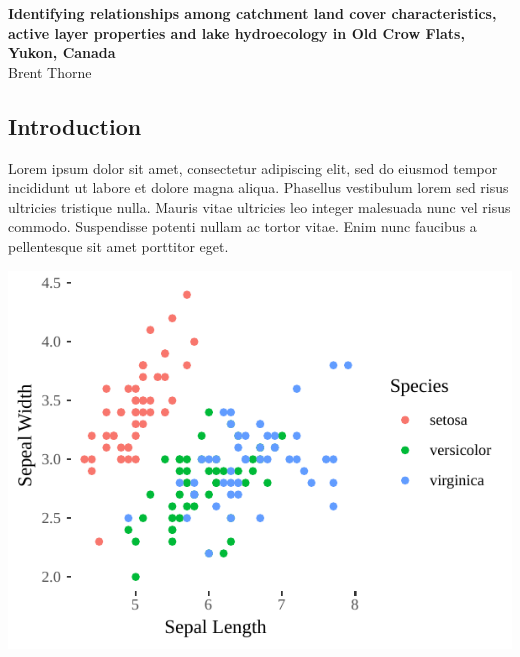\documentclass[30pt,extrafontsizes]{memoir}
\begin{document}
\begingroup
  \centering
  \huge\textbf{Identifying relationships among catchment land cover characteristics,
active layer properties and lake hydroecology in Old Crow Flats, Yukon,
Canada}\\[0.3in]
  \large Brent Thorne\par
\endgroup
\vspace{1.2in}

\begin{multicols*}{3}
\small{\noindent
\section{Introduction}\label{introduction}

Lorem ipsum dolor sit amet,
\textcite{holdenIdentifyingStructuralComplexity2012} consectetur
adipiscing elit, sed do eiusmod tempor incididunt ut labore et dolore
magna aliqua. Phasellus vestibulum lorem sed risus ultricies tristique
nulla. Mauris vitae ultricies leo integer malesuada nunc vel risus
commodo. Suspendisse potenti nullam ac tortor vitae. Enim nunc faucibus
a pellentesque sit amet porttitor eget.

\begin{center}\includegraphics[width=1\linewidth]{skeleton_files/figure-latex/unnamed-chunk-2-1} \end{center}

}
\end{multicols*}
\end{document}

